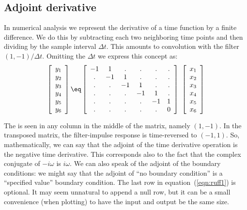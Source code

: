\subsection{Adjoint derivative}
In numerical analysis we represent the derivative of a time function
by a finite difference.
We do this by subtracting each two neighboring time points and then
dividing by the sample interval $\Delta t$.
This amounts to convolution with the filter $(1,-1)/\Delta t$.
Omitting the $\Delta t$ we express this concept as:
\begin{equation}
\left[ \begin{array}{c}
        y_1 \\
        y_2 \\
        y_3 \\
        y_4 \\
        y_5 \\
        y_6
        \end{array} \right]
\eq
\left[ \begin{array}{cccccc}
        -1& 1& .& .& .& . \\
         .&-1& 1& .& .& . \\
         .& .&-1& 1& .& . \\
         .& .& .&-1& 1& . \\
         .& .& .& .&-1& 1 \\
         .& .& .& .& .& 0
        \end{array} \right] \ 
\left[ \begin{array}{c}
        x_1 \\
        x_2 \\
        x_3 \\
        x_4 \\
        x_5 \\
        x_6
        \end{array} \right]
 \label{eqn:ruff1}
\end{equation}
\par
The  is seen in any column
in the middle of the matrix, namely $(1,-1)$. 
In the transposed matrix,
the filter-impulse response
is time-reversed to $(-1,1)$.
So, mathematically,
we can say that the adjoint of the time derivative operation
is the negative time derivative.
This corresponds also to the fact that
the complex conjugate of $-i\omega$ is $i\omega$.
We can also speak of the adjoint of the boundary conditions:
we might say that the adjoint of ``no boundary condition''
is a ``specified value'' boundary condition.
The last row in equation~(\ref{eqn:ruff1}) is optional.
It may seem unnatural to append a null row, but it can be a small
convenience (when plotting) to have the input and output be the same size.
\par

